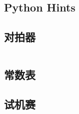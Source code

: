 \documentclass[10pt, a4paper, oneside]{ctexart}
\begin{document}
\begin{multicols}{2}
        \subsection{Python Hints}
        
        \subsection{对拍器}
        \inputminted{python3}{src/tools/llx_checker.py}
        \subsection{常数表}
        
        \subsection{试机赛}
        
    \end{multicols}
\end{document}
